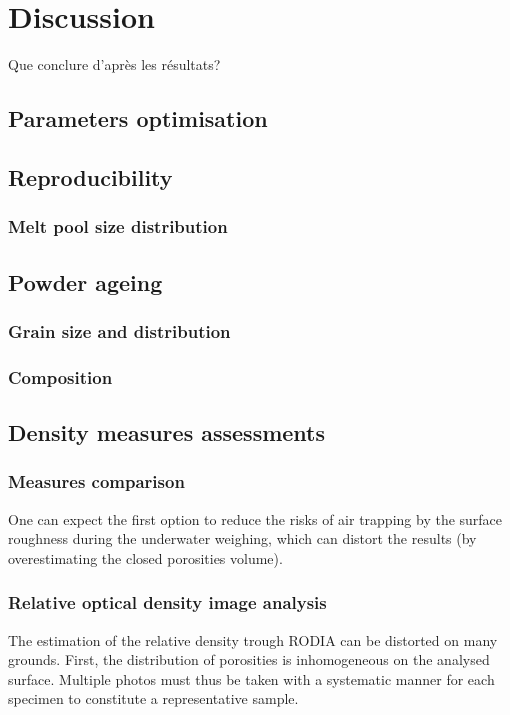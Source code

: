 \chapter{Discussion}
\label{Chap5}
Que conclure d'après les résultats?

\section{Parameters optimisation}

\section{Reproducibility}

\subsection{Melt pool size distribution}


\section{Powder ageing}
\subsection{Grain size and distribution}


\subsection{Composition}

\section{Density measures assessments}
\subsection{Measures comparison}

One can expect the first option to reduce the risks of air trapping by the surface roughness during the underwater weighing, which can distort the results (by overestimating the closed porosities volume). %

\subsection{Relative optical density image analysis}
The estimation of the relative density trough RODIA can be distorted on many grounds. First, the distribution of porosities is inhomogeneous on the analysed surface. Multiple photos must thus be taken with a systematic manner for each specimen to constitute a representative sample.\\

